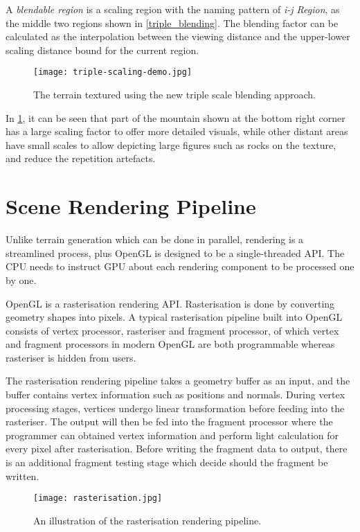\documentclass[oneside, a4paper]{report}
\begin{document}
    A \textit{blendable region} is a scaling region with the naming pattern of \textit{i-j Region}, as the middle two regions shown in \ref{triple_blending}. The blending factor can be calculated as the interpolation between the viewing distance and the upper-lower scaling distance bound for the current region.

    \begin{figure}[H]
        \texttt{[image: triple-scaling-demo.jpg]}
        \caption{The terrain textured using the new triple scale blending approach.}
        \label{triple_scale_demo}
    \end{figure}

    In \ref{triple_scale_demo}, it can be seen that part of the mountain shown at the bottom right corner has a large scaling factor to offer more detailed visuals, while other distant areas have small scales to allow depicting large figures such as rocks on the texture, and reduce the repetition artefacts.

    \section{Scene Rendering Pipeline}

    Unlike terrain generation which can be done in parallel, rendering is a streamlined process, plus OpenGL is designed to be a single-threaded API. The CPU needs to instruct GPU about each rendering component to be processed one by one.

    OpenGL is a rasterisation rendering API. Rasterisation is done by converting geometry shapes into pixels. A typical rasterisation pipeline built into OpenGL consists of vertex processor, rasteriser and fragment processor, of which vertex and fragment processors in modern OpenGL are both programmable whereas rasteriser is hidden from users.

    The rasterisation rendering pipeline takes a geometry buffer as an input, and the buffer contains vertex information such as positions and normals. During vertex processing stages, vertices undergo linear transformation before feeding into the rasteriser. The output will then be fed into the fragment processor where the programmer can obtained vertex information and perform light calculation for every pixel after rasterisation. Before writing the fragment data to output, there is an additional fragment testing stage which decide should the fragment be written.

    \begin{figure}[H]
        \texttt{[image: rasterisation.jpg]}
        \caption{An illustration of the rasterisation rendering pipeline.}
    \end{figure}
    
\end{document}
